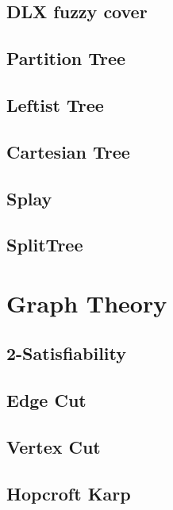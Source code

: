 \documentclass[a4paper,5pt,twocolumn,titlepage]{article}
\begin{document}
\begin{CJK*}{GBK}{song}
\subsection{DLX fuzzy cover}

\subsection{Partition Tree}

\subsection{Leftist Tree}

\subsection{Cartesian Tree}

\subsection{Splay}

\subsection{SplitTree}

\section{Graph Theory}
\subsection{2-Satisfiability}

\subsection{Edge Cut}

\subsection{Vertex Cut}

\subsection{Hopcroft Karp}


\end{CJK*}
\end{document}
